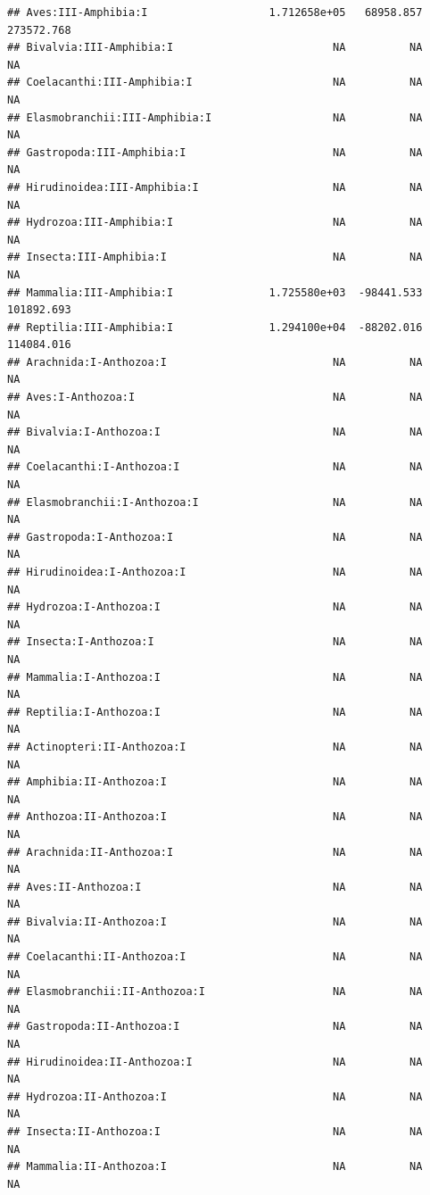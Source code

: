 \documentclass[
  12pt,
]{article}
\begin{document}
\begin{verbatim}
## Aves:III-Amphibia:I                   1.712658e+05   68958.857  273572.768
## Bivalvia:III-Amphibia:I                         NA          NA          NA
## Coelacanthi:III-Amphibia:I                      NA          NA          NA
## Elasmobranchii:III-Amphibia:I                   NA          NA          NA
## Gastropoda:III-Amphibia:I                       NA          NA          NA
## Hirudinoidea:III-Amphibia:I                     NA          NA          NA
## Hydrozoa:III-Amphibia:I                         NA          NA          NA
## Insecta:III-Amphibia:I                          NA          NA          NA
## Mammalia:III-Amphibia:I               1.725580e+03  -98441.533  101892.693
## Reptilia:III-Amphibia:I               1.294100e+04  -88202.016  114084.016
## Arachnida:I-Anthozoa:I                          NA          NA          NA
## Aves:I-Anthozoa:I                               NA          NA          NA
## Bivalvia:I-Anthozoa:I                           NA          NA          NA
## Coelacanthi:I-Anthozoa:I                        NA          NA          NA
## Elasmobranchii:I-Anthozoa:I                     NA          NA          NA
## Gastropoda:I-Anthozoa:I                         NA          NA          NA
## Hirudinoidea:I-Anthozoa:I                       NA          NA          NA
## Hydrozoa:I-Anthozoa:I                           NA          NA          NA
## Insecta:I-Anthozoa:I                            NA          NA          NA
## Mammalia:I-Anthozoa:I                           NA          NA          NA
## Reptilia:I-Anthozoa:I                           NA          NA          NA
## Actinopteri:II-Anthozoa:I                       NA          NA          NA
## Amphibia:II-Anthozoa:I                          NA          NA          NA
## Anthozoa:II-Anthozoa:I                          NA          NA          NA
## Arachnida:II-Anthozoa:I                         NA          NA          NA
## Aves:II-Anthozoa:I                              NA          NA          NA
## Bivalvia:II-Anthozoa:I                          NA          NA          NA
## Coelacanthi:II-Anthozoa:I                       NA          NA          NA
## Elasmobranchii:II-Anthozoa:I                    NA          NA          NA
## Gastropoda:II-Anthozoa:I                        NA          NA          NA
## Hirudinoidea:II-Anthozoa:I                      NA          NA          NA
## Hydrozoa:II-Anthozoa:I                          NA          NA          NA
## Insecta:II-Anthozoa:I                           NA          NA          NA
## Mammalia:II-Anthozoa:I                          NA          NA          NA

\end{verbatim}
\end{document}
